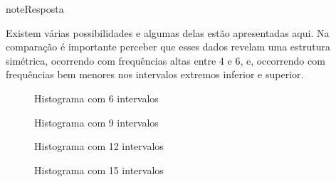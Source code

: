 \begin{sphinxadmonition}{note}{Resposta}

Existem várias possibilidades e algumas delas estão apresentadas aqui. Na comparação é importante perceber que esses dados revelam uma estrutura simétrica, ocorrendo com frequências altas entre 4 e 6, e, occorrendo com frequências bem menores nos intervalos extremos inferior e superior.

\begin{figure}[H]
\centering
\capstart

\noindent{}
\caption{Histograma com 6 intervalos}\label{\detokenize{PE103-5:id1}}\label{\detokenize{PE103-5:id7}}\end{figure}

\begin{figure}[H]
\centering
\capstart

\noindent{}
\caption{Histograma com 9 intervalos}\label{\detokenize{PE103-5:id2}}\label{\detokenize{PE103-5:id8}}\end{figure}

\begin{figure}[H]
\centering
\capstart

\noindent{}
\caption{Histograma com 12 intervalos}\label{\detokenize{PE103-5:id3}}\label{\detokenize{PE103-5:id9}}\end{figure}

\begin{figure}[H]
\centering
\capstart

\noindent{}
\caption{Histograma com 15 intervalos}\label{\detokenize{PE103-5:id4}}\label{\detokenize{PE103-5:id10}}\end{figure}
\end{sphinxadmonition}
\label{\detokenize{PE103-5:ativ-titulo-da-histogramas-intervalos-desiguais}}
